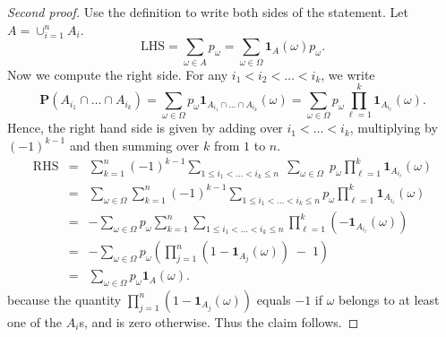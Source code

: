 \documentclass[preprint,  11pt]{amsart}
\theoremstyle{plain} %
\newtheorem{proposition}[theorem]{Proposition}
\theoremstyle{definition} %
\begin{document}
\begin{proof}[Second proof] Use the definition to write both sides of the statement. Let $A=\cup_{i=1}^{n}A_{i}$.
$$
\mbox{LHS}= \sum\limits_{\omega\in A}p_{\omega} = \sum\limits_{\omega\in \Omega}{\mathbf 1}_{A}(\omega)p_{\omega}.
$$
Now we compute the right side. For any $i_{1}<i_{2}<\ldots <i_{k}$, we write
$$
\mathbf{P}\left(A_{i_{1}}\cap \ldots \cap A_{i_{k}}\right) =\sum\limits_{\omega\in \Omega}p_{\omega}{\mathbf 1}_{A_{i_{1}}\cap \ldots \cap A_{i_{k}}}(\omega)= \sum\limits_{\omega\in \Omega}p_{\omega}\prod\limits_{\ell=1}^{k}{\mathbf 1}_{A_{i_{\ell}}}(\omega).
$$
Hence, the right hand side is given by adding over $i_{1}<\ldots <i_{k}$, multiplying by $(-1)^{k-1}$ and then summing over $k$ from $1$ to $n$.
\begin{eqnarray*}
\mbox{RHS} &=& \sum\limits_{k=1}^{n}(-1)^{k-1}\sum\limits_{1\le i_{1}<\ldots <i_{k}\le n} \; \sum\limits_{\omega\in \Omega} \;p_{\omega}\prod\limits_{\ell=1}^{k}{\mathbf 1}_{A_{i_{\ell}}}(\omega) \\
&=& \sum\limits_{\omega \in \Omega}\sum\limits_{k=1}^{n}(-1)^{k-1}\sum\limits_{1\le i_{1}<\ldots <i_{k}\le n} p_{\omega}\prod\limits_{\ell=1}^{k}{\mathbf 1}_{A_{i_{\ell}}}(\omega) \\
&=& -\sum\limits_{\omega \in \Omega}p_{\omega}\sum\limits_{k=1}^{n}\sum\limits_{1\le i_{1}<\ldots <i_{k}\le n}\prod\limits_{\ell=1}^{k}(-{\mathbf 1}_{A_{i_{\ell}}}(\omega)) \\
&=& -\sum\limits_{\omega \in \Omega}p_{\omega} \left(\prod\limits_{j=1}^{n}(1-{\mathbf 1}_{A_{j}}(\omega)) \; - \; 1\right) \\
&=& \sum\limits_{\omega \in \Omega}p_{\omega}{\mathbf 1}_{A}(\omega).
\end{eqnarray*}
because the quantity $\prod\limits_{j=1}^{n}(1-{\mathbf 1}_{A_{j}}(\omega))$ equals $-1$ if $\omega$ belongs to at least one of the $A_{i}$s, and is zero otherwise. Thus the claim follows.
\end{proof}
\end{document}
